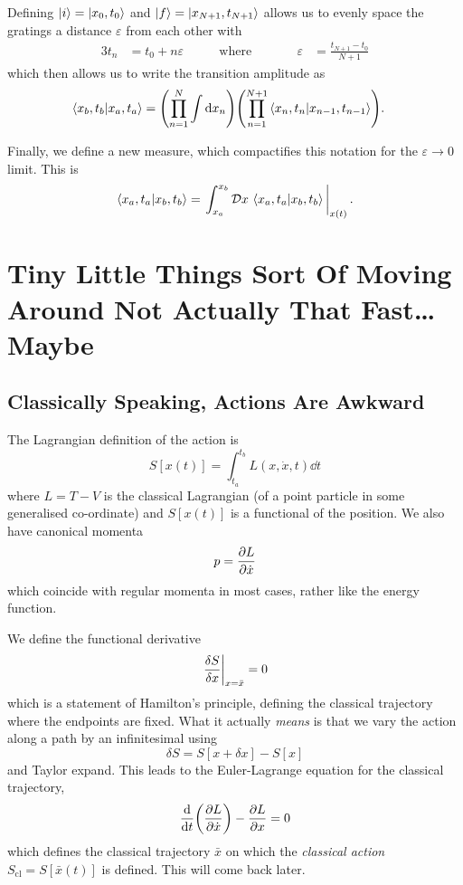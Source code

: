 \documentclass[]{revision-notes}
\begin{document}
Defining \(\ket{i} = \ket{x_0, t_0} \) and \( \ket{f} = \ket{x_{N+1}, t_{N+1}} \) allows us to evenly space the gratings a distance \( \varepsilon \) from each other with
\begin{alignat*}{3}
  t_n &= t_0 + n\varepsilon & \qquad \text{where}&\qquad& \varepsilon &= \frac{t_{N+1} - t_0}{N+1}
\end{alignat*}
which then allows us to write the transition amplitude as
\begin{align*}
  \braket{x_b, t_b}{x_a, t_a} &= \qty(\prod_{n=1}^{N}\int\dd{x_n})\qty(\prod_{n=1}^{N+1}\braket{x_{n}, t_{n}}{x_{n-1}, t_{n-1}}).
\end{align*}

Finally, we define a new measure, which compactifies this notation for the \(\varepsilon \to 0 \) limit.
This is \[ \braket{x_a, t_a}{x_b, t_b} =  \eval{\int_{x_a}^{x_b}\DD{x}\braket{x_a, t_a}{x_b, t_b}}_{x(t)}. \]

\chapter{Tiny Little Things Sort Of Moving Around Not Actually That Fast\ldots{} Maybe}
\section{Classically Speaking, Actions Are Awkward}
The Lagrangian definition of the action is \[ S[x(t)] = \int_{t_a}^{t_b} L(x, \dot{x}, t) \dd{t} \]
where \(L = T-V \) is the classical Lagrangian (of a point particle in some generalised co-ordinate) and \(S[x(t)]\) is a functional of the position. We also have canonical momenta \[ p = \pdv{L}{\dot{x}} \] which coincide with regular momenta in most cases, rather like the energy function.

We define the functional derivative
\[ \eval{\frac{\delta S}{\delta x}}_{x = \bar x} = 0 \] which is a statement of Hamilton's principle, defining the classical trajectory where the endpoints are fixed. What it actually \emph{means} is that we vary the action along a path by an infinitesimal using \[ \delta S = S[x + \delta x] - S[x] \] and Taylor expand. This leads to the Euler-Lagrange equation for the classical trajectory, \[ \dv{t}(\pdv{L}{\dot x}) - \pdv{L}{x} = 0 \] which defines the classical trajectory \(\bar{x} \) on which the \emph{classical action}
\(S_{\mathrm{cl}} = S[\bar x(t)]\) is defined. This will come back later.
\end{document}

